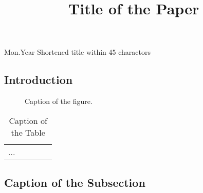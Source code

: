 \documentclass[12pt,twoside]{article}
\begin{document}
\setcounter{page}{1}

\setpageinformation
{}
{ }{ }{}{Mon.}{Year}
{Shortened title within 45 charactors}

\begin{CJK}{GBK}{song}

\title{Title of the Paper}



\begin{abstract}
\end{abstract}


\begin{multicols}{2}
\normalsize
\section{Introduction}

\begin{figure}
\footnotesize\centering
\caption{Caption of the figure.}
\end{figure}

\begin{table}
\caption{Caption of the Table}
\centering
\begin{tabular}{ccccc}
...
\end{tabular}
\end{table}

\subsection{Caption of the Subsection}




\begin{thebibliography}{00}


\end{thebibliography}



\end{multicols}
\end{CJK}
\end{document}
